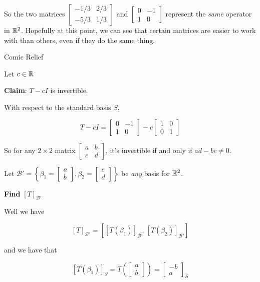 \documentclass[12pt]{article}
\def\B{\mathcal B}
\begin{document}
  So the two matrices $\begin{bmatrix}
      -1 / 3 & 2 / 3 \\
      -5 / 3 & 1 / 3
    \end{bmatrix}$ and $\begin{bmatrix}
      0 & -1 \\
      1 & 0
    \end{bmatrix}$ represent the {\it same} operator in ${\mathbb R}^2$. Hopefully at
    this point, we can see that certain matrices are easier to work with than
    others, even if they do the same thing.

  {\bf} Comic Relief

  Let $c \in {\mathbb R}$

  {\bf Claim}: $T - cI$ is invertible.

  With respect to the standard basis $S$,

  \[
    T - cI = \begin{bmatrix} 
      0 & -1 \\ 
      1 & 0 
    \end{bmatrix} 
    - c 
    \begin{bmatrix} 
    1 & 0 \\ 
    0 & 1 
    \end{bmatrix}
  \]

  So for any $2 \times 2$ matrix $\begin{bmatrix}
    a & b \\ c & d
  \end{bmatrix}$, it's invertible if and only if $ad - bc \ne
  0$.


  Let $\B' = \left\{\beta_1 = \begin{bmatrix} a \\ b \end{bmatrix}, \beta_2 = \begin{bmatrix} c \\ d
  \end{bmatrix}\right\}$ be {\it any} basis for ${\mathbb R}^2$.

  {\bf Find} $[T]_{\B'}$

  Well we have

  \[
    [T]_{\B'} = \left[[T(\beta_1)]_{\B'}, [T(\beta_2)]_{\B'}\right]
  \]

  and we have that

  \[
    [T(\beta_1)]_S = T(\begin{bmatrix}
      a \\ b
    \end{bmatrix})
    =
    \begin{bmatrix}
      -b \\ a
    \end{bmatrix}_S
  \]
\end{document}
